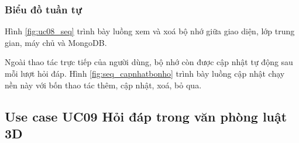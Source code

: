 \documentclass[../DoAn.tex]{subfiles}
\begin{document}

\subsubsection{Biểu đồ tuần tự}
Hình \ref{fig:uc08_seq} trình bày luồng xem và xoá bộ nhớ giữa giao diện, lớp trung gian, máy chủ và MongoDB.


Ngoài thao tác trực tiếp của người dùng, bộ nhớ còn được cập nhật tự động sau mỗi lượt hỏi đáp. Hình \ref{fig:seq_capnhatbonho} trình bày luồng cập nhật chạy nền này với bốn thao tác thêm, cập nhật, xoá, bỏ qua.



\subsection{Use case UC09 Hỏi đáp trong văn phòng luật 3D}
\label{subsection:uc09}
\end{document}
